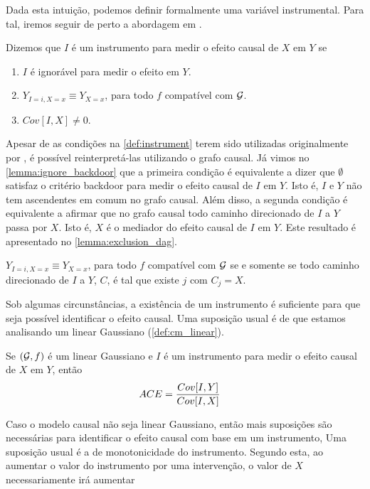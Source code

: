 Dada esta intuição, podemos
definir formalmente uma variável instrumental.
Para tal, iremos seguir de perto 
a abordagem em \citet{Angrist1996}.

\begin{definition}
 \label{def:instrument}
 Dizemos que $I$ é um instrumento para
 medir o efeito causal de $X$ em $Y$ se
 \begin{enumerate}
  \item $I$ é ignorável para medir o efeito em $Y$.
  \item $Y_{I=i,X=x} \equiv Y_{X=x}$,
  para todo $f$ compatível com ${\mathcal G}$.
  \item $Cov[I,X] \neq 0$.
 \end{enumerate}
\end{definition}

Apesar de as condições na \cref{def:instrument} terem sido
utilizadas originalmente por \citet{Angrist1996},
é possível reinterpretá-las utilizando o grafo causal.
Já vimos no \cref{lemma:ignore_backdoor} que
a primeira condição é equivalente a dizer que
$\emptyset$ satisfaz o critério backdoor para 
medir o efeito causal de $I$ em $Y$.
Isto é, $I$ e $Y$ não tem 
ascendentes em comum no grafo causal.
Além disso, a segunda condição é
equivalente a afirmar que no grafo causal
todo caminho direcionado de $I$ a $Y$
passa por $X$. Isto é,
$X$ é o mediador do efeito causal de $I$ em $Y$.
Este resultado é apresentado no \cref{lemma:exclusion_dag}.

\begin{lemma}
 \label{lemma:exclusion_dag}
 $Y_{I=i, X=x} \equiv Y_{X=x}$,
 para todo $f$ compatível com ${\mathcal G}$ se e somente se
 todo caminho direcionado de $I$ a $Y$, $C$,
 é tal que existe $j$ com $C_j = X$.
\end{lemma}

Sob algumas circunstâncias,
a existência de um instrumento é
suficiente para que
seja possível identificar o efeito causal.
Uma suposição usual é de que
estamos analisando um
\CM linear Gaussiano (\cref{def:cm_linear}).

\begin{theorem}
 \label{thm:linear_instrument}
 Se $({\mathcal G},f)$ é um \CM linear Gaussiano e
 $I$ é um instrumento para
 medir o efeito causal de $X$ em $Y$, então
 \begin{align*}
  {ACE} &= \frac{Cov[I,Y]}{Cov[I,X]}
 \end{align*}
\end{theorem}

Caso o modelo causal não seja linear Gaussiano,
então mais suposições são necessárias
para identificar o efeito causal 
com base em um instrumento,
Uma suposição usual é
a de monotonicidade do instrumento.
Segundo esta, ao aumentar 
o valor do instrumento por uma intervenção,
o valor de $X$ necessariamente irá aumentar

